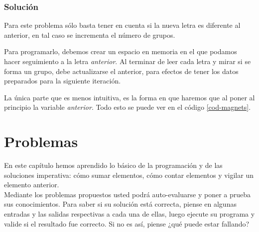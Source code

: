 \subsubsection{Solución}

Para este problema sólo basta tener en cuenta si la nueva letra es diferente al anterior, en tal caso se incrementa el número de grupos.

Para programarlo, debemos crear un espacio en memoria en el que podamos hacer seguimiento a la letra \emph{anterior}. Al terminar de leer cada letra y mirar si se forma un grupo, debe actualizarse el anterior, para efectos de tener los datos preparados para la siguiente iteración.

La única parte que es menos intuitiva, es la forma en que haremos que al poner al principio la variable \emph{anterior}. Todo esto se puede ver en el código \ref{cod-magnets}. \\

 
 
 
\newpage
\section{Problemas}
En este capítulo hemos aprendido lo básico de la programación y de las soluciones imperativa: cómo sumar elementos, cómo contar elementos y vigilar un elemento anterior. \\

Mediante los problemas propuestos usted podrá auto-evaluarse y poner a prueba sus conocimientos. Para saber si su solución está correcta, piense en algunas entradas y las salidas respectivas a cada una de ellas, luego ejecute su programa y valide si el resultado fue correcto. Si no es así, piense ¿qué puede estar fallando?

\vfill


